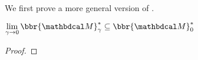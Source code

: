 We first prove a more general version of .
\begin{lemma}\label{lem:gamma2zero}
$\lim\limits_{\gamma\to0}\bbr{\dg M}_\gamma^* \subseteq \bbr{\dg M}_0^*$ 
\end{lemma}
\begin{proof}
\def\lb{k}
\def\ub{K}  


\end{proof}

